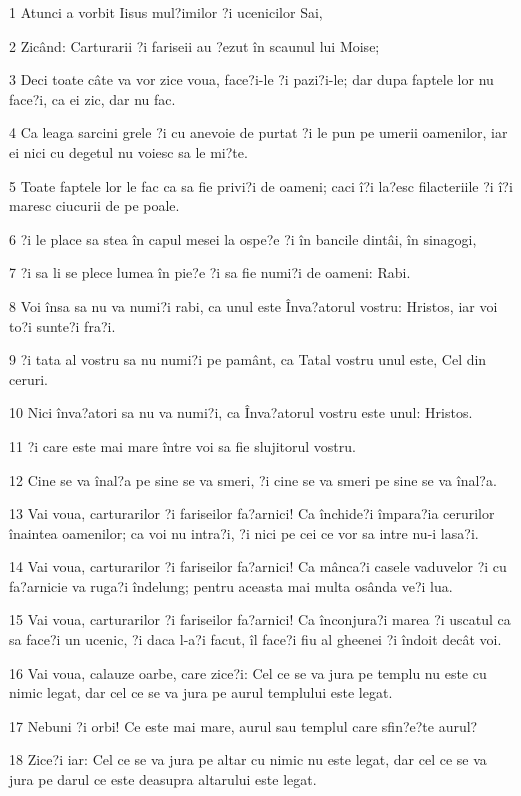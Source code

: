 \par 1 Atunci a vorbit Iisus mul?imilor ?i ucenicilor Sai,
\par 2 Zicând: Carturarii ?i fariseii au ?ezut în scaunul lui Moise;
\par 3 Deci toate câte va vor zice voua, face?i-le ?i pazi?i-le; dar dupa faptele lor nu face?i, ca ei zic, dar nu fac.
\par 4 Ca leaga sarcini grele ?i cu anevoie de purtat ?i le pun pe umerii oamenilor, iar ei nici cu degetul nu voiesc sa le mi?te.
\par 5 Toate faptele lor le fac ca sa fie privi?i de oameni; caci î?i la?esc filacteriile ?i î?i maresc ciucurii de pe poale.
\par 6 ?i le place sa stea în capul mesei la ospe?e ?i în bancile dintâi, în sinagogi,
\par 7 ?i sa li se plece lumea în pie?e ?i sa fie numi?i de oameni: Rabi.
\par 8 Voi însa sa nu va numi?i rabi, ca unul este Înva?atorul vostru: Hristos, iar voi to?i sunte?i fra?i.
\par 9 ?i tata al vostru sa nu numi?i pe pamânt, ca Tatal vostru unul este, Cel din ceruri.
\par 10 Nici înva?atori sa nu va numi?i, ca Înva?atorul vostru este unul: Hristos.
\par 11 ?i care este mai mare între voi sa fie slujitorul vostru.
\par 12 Cine se va înal?a pe sine se va smeri, ?i cine se va smeri pe sine se va înal?a.
\par 13 Vai voua, carturarilor ?i fariseilor fa?arnici! Ca închide?i împara?ia cerurilor înaintea oamenilor; ca voi nu intra?i, ?i nici pe cei ce vor sa intre nu-i lasa?i.
\par 14 Vai voua, carturarilor ?i fariseilor fa?arnici! Ca mânca?i casele vaduvelor ?i cu fa?arnicie va ruga?i îndelung; pentru aceasta mai multa osânda ve?i lua.
\par 15 Vai voua, carturarilor ?i fariseilor fa?arnici! Ca înconjura?i marea ?i uscatul ca sa face?i un ucenic, ?i daca l-a?i facut, îl face?i fiu al gheenei ?i îndoit decât voi.
\par 16 Vai voua, calauze oarbe, care zice?i: Cel ce se va jura pe templu nu este cu nimic legat, dar cel ce se va jura pe aurul templului este legat.
\par 17 Nebuni ?i orbi! Ce este mai mare, aurul sau templul care sfin?e?te aurul?
\par 18 Zice?i iar: Cel ce se va jura pe altar cu nimic nu este legat, dar cel ce se va jura pe darul ce este deasupra altarului este legat.
